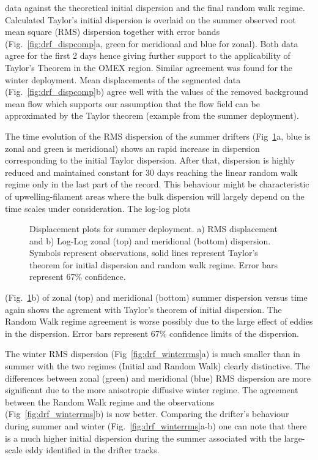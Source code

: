 data against the theoretical initial dispersion and the final
random walk regime. Calculated Taylor's initial dispersion is
overlaid on the summer observed root mean square (RMS) dispersion
together with error bands (Fig.~\ref{fig:drf_dispcomp}a, green for
meridional and blue for zonal). Both data agree for the first 2
days hence giving further support to the applicability of Taylor's
Theorem in the OMEX region. Similar agreement was found for the
winter deployment. Mean displacements of the segmented data
(Fig.~\ref{fig:drf_dispcomp}b) agree well with the values of the
removed background mean flow which supports our assumption that
the flow field can be approximated by the Taylor theorem (example
from the summer deployment).

The time evolution of  the RMS dispersion of the summer drifters
(Fig~\ref{fig:drf_summerrms}a, blue is zonal and green is
meridional) shows an rapid increase in dispersion corresponding to
the initial Taylor dispersion. After that, dispersion is highly
reduced and maintained constant for 30 days reaching the linear
random walk regime only in the last part of the record. This
behaviour might be characteristic of upwelling-filament areas
where the bulk dispersion will largely depend on the time scales
under consideration. The log-log plots\begin{figure}
\centering %
\caption{Displacement plots for summer deployment. a) RMS
displacement and b) Log-Log zonal (top) and meridional (bottom)
dispersion. Symbols represent observations,  solid lines represent
Taylor's theorem for initial dispersion and random walk regime.
Error bars represent 67\% confidence.}
\label{fig:drf_summerrms}%
\end{figure}
(Fig.~\ref{fig:drf_summerrms}b) of zonal (top) and meridional
(bottom) summer dispersion versus time again shows the agrement
with Taylor's theorem of initial dispersion. The Random Walk
regime agreement is worse possibly due to the large effect of
eddies in the dispersion. Error bars represent 67\% confidence
limits of the dispersion.

The winter RMS dispersion (Fig~\ref{fig:drf_winterrms}a) is much
smaller than in summer with the two regimes (Initial and Random
Walk) clearly distinctive. The differences between zonal (green)
and meridional (blue) RMS dispersion are more significant due to
the more anisotropic diffusive winter regime. The agreement
between the Random Walk regime and the observations
(Fig~\ref{fig:drf_winterrms}b) is now better. Comparing the
drifter's behaviour during summer and winter
(Fig.~\ref{fig:drf_winterrms}a-b) one can note that there is a
much higher initial dispersion during the summer associated with
the large-scale eddy identified in the drifter tracks.

